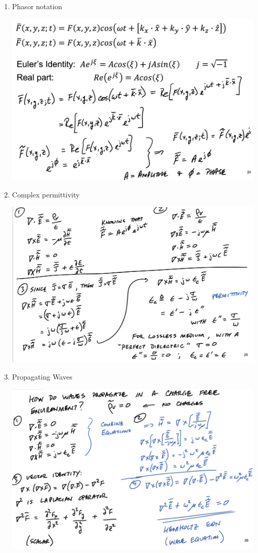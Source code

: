 \documentclass[10pt]{article}
\begin{document}
\begin{enumerate}
	
	\item Phasor notation
	
	\includegraphics[width=0.99\textwidth]{figs/PhasorNotation.png}
	
	
	\item Complex permittivity
	
	\includegraphics[width=0.99\textwidth]{figs/ComplexPermittivity.png}
	
	\item Propagating Waves
	
	\includegraphics[width=0.99\textwidth]{figs/PropagatingWaves.png}


\end{enumerate}
\break
\end{document}
